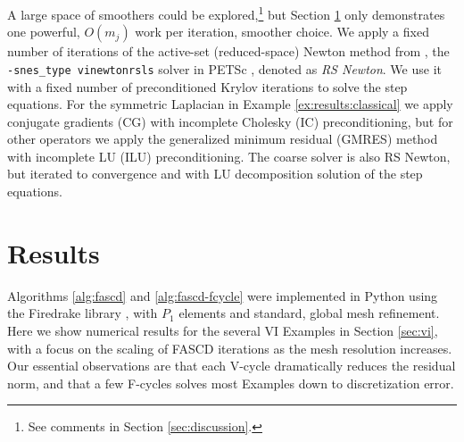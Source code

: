 \documentclass[letterpaper,final,12pt,reqno]{amsart}
\theoremstyle{cstyle}
\theoremstyle{cstyle*}
\theoremstyle{dstyle}
\numberwithin{equation}{section}
\numberwithin{figure}{section}
\numberwithin{table}{section}
\numberwithin{theorem}{section}
\begin{document}

A large space of smoothers could be explored,\footnote{See comments in Section \ref{sec:discussion}.} but Section \ref{sec:results} only demonstrates one powerful, $O(m_j)$ work per iteration, smoother choice.  We apply a fixed number of iterations of the active-set (reduced-space) Newton method from \cite{BensonMunson2006}, the \texttt{-snes\_type vinewtonrsls} solver in PETSc \cite{Balayetal2023}, denoted as \emph{RS Newton}.  We use it with a fixed number of preconditioned Krylov iterations to solve the step equations.  For the symmetric Laplacian in Example \ref{ex:results:classical} we apply conjugate gradients (CG) with incomplete Cholesky (IC) preconditioning, but for other operators we apply the generalized minimum residual (GMRES) method with incomplete LU (ILU) preconditioning.  The coarse solver is also RS Newton, but iterated to convergence and with LU decomposition solution of the step equations.


\section{Results} \label{sec:results}

Algorithms \ref{alg:fascd} and \ref{alg:fascd-fcycle} were implemented in Python using the Firedrake library \cite{Rathgeberetal2016}, with $P_1$ elements and standard, global mesh refinement.  Here we show numerical results for the several VI Examples in Section \ref{sec:vi}, with a focus on the scaling of FASCD iterations as the mesh resolution increases.  Our essential observations are that each V-cycle dramatically reduces the residual norm, and that a few F-cycles solves most Examples down to discretization error.
\end{document}
